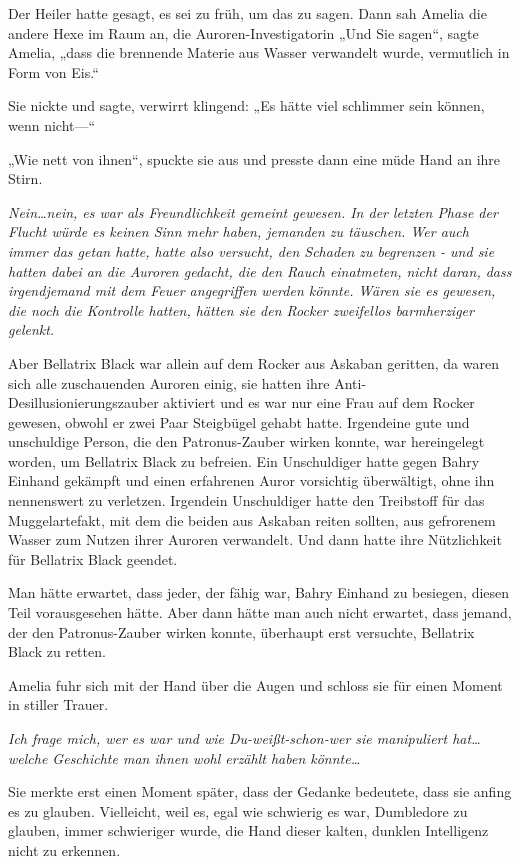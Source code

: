 {Der Heiler hatte gesagt, es sei zu früh, um das zu sagen. Dann sah Amelia die andere Hexe im Raum an, die Auroren-Investigatorin „Und Sie sagen“, sagte Amelia, „dass die brennende Materie aus Wasser verwandelt wurde, vermutlich in Form von Eis.“

Sie nickte und sagte, verwirrt klingend: „Es hätte viel schlimmer sein können, wenn nicht—“

„Wie nett von ihnen“, spuckte sie aus und presste dann eine müde Hand an ihre Stirn.

\emph{Nein…nein, es war als Freundlichkeit gemeint gewesen. In der letzten Phase der Flucht würde es keinen Sinn mehr haben, jemanden zu täuschen. Wer auch immer das getan hatte, hatte also versucht, den Schaden zu begrenzen - und sie hatten dabei an die Auroren gedacht, die den Rauch einatmeten, nicht daran, dass irgendjemand mit dem Feuer angegriffen werden könnte. Wären sie es gewesen, die noch die Kontrolle hatten, hätten sie den Rocker zweifellos barmherziger gelenkt.}

Aber Bellatrix Black war allein auf dem Rocker aus Askaban geritten, da waren sich alle zuschauenden Auroren einig, sie hatten ihre Anti-Desillusionierungszauber aktiviert und es war nur eine Frau auf dem Rocker gewesen, obwohl er zwei Paar Steigbügel gehabt hatte. Irgendeine gute und unschuldige Person, die den Patronus-Zauber wirken konnte, war hereingelegt worden, um Bellatrix Black zu befreien. Ein Unschuldiger hatte gegen Bahry Einhand gekämpft und einen erfahrenen Auror vorsichtig überwältigt, ohne ihn nennenswert zu verletzen. Irgendein Unschuldiger hatte den Treibstoff für das Muggelartefakt, mit dem die beiden aus Askaban reiten sollten, aus gefrorenem Wasser zum Nutzen ihrer Auroren verwandelt. Und dann hatte ihre Nützlichkeit für Bellatrix Black geendet.

Man hätte erwartet, dass jeder, der fähig war, Bahry Einhand zu besiegen, diesen Teil vorausgesehen hätte. Aber dann hätte man auch nicht erwartet, dass jemand, der den Patronus-Zauber wirken konnte, überhaupt erst versuchte, Bellatrix Black zu retten.

Amelia fuhr sich mit der Hand über die Augen und schloss sie für einen Moment in stiller Trauer.

\emph{Ich frage mich, wer es war und wie Du-weißt-schon-wer sie manipuliert hat… welche Geschichte man ihnen wohl erzählt haben könnte…}

Sie merkte erst einen Moment später, dass der Gedanke bedeutete, dass sie anfing es zu glauben. Vielleicht, weil es, egal wie schwierig es war, Dumbledore zu glauben, immer schwieriger wurde, die Hand dieser kalten, dunklen Intelligenz nicht zu erkennen.

}
